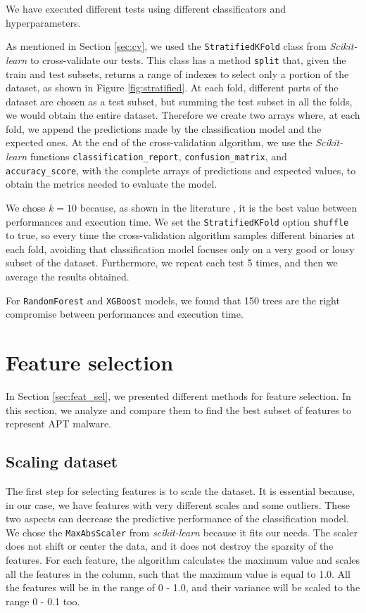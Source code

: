 We have executed different tests using different classificators and hyperparameters. 

As mentioned in Section \ref{sec:cv}, we used the \texttt{StratifiedKFold} class from \textit{Scikit-learn} to cross-validate our tests. This class has a method \texttt{split} that, given the train and test subsets, returns a range of indexes to select only a portion of the dataset, as shown in Figure \ref{fig:stratified}.  At each fold, different parts of the dataset are chosen as a test subset, but summing the test subset in all the folds, we would obtain the entire dataset. Therefore we create two arrays where, at each fold, we append the predictions made by the classification model and the expected ones. At the end of the cross-validation algorithm, we use the \textit{Scikit-learn} functions \texttt{classification\_report}, \texttt{confusion\_matrix}, and \texttt{accuracy\_score}, with the complete arrays of predictions and expected values, to obtain the metrics needed to evaluate the model.

We chose $k = 10$ because, as shown in the literature \cite{kohavi1995study}, it is the best value between performances and execution time. 
We set the \texttt{StratifiedKFold} option \texttt{shuffle} to true, so every time the cross-validation algorithm samples different binaries at each fold, avoiding that classification model focuses only on a very good or lousy subset of the dataset. Furthermore, we repeat each test 5 times, and then we average the results obtained.

For \texttt{RandomForest} and \texttt{XGBoost} models, we found that 150 trees are the right compromise between performances and execution time.

\section{Feature selection}
In Section \ref{sec:feat_sel}, we presented different methods for feature selection. In this section, we analyze and compare them to find the best subset of features to represent APT malware.

\subsection{Scaling dataset}
The first step for selecting features is to scale the dataset. It is essential because, in our case, we have features with very different scales and some outliers. These two aspects can decrease the predictive performance of the classification model. We chose the \texttt{MaxAbsScaler} from \textit{scikit-learn} because it fits our needs. The scaler does not shift or center the data, and it does not destroy the sparsity of the features. For each feature, the algorithm calculates the maximum value and scales all the features in the column, such that the maximum value is equal to 1.0. All the features will be in the range of 0 - 1.0, and their variance will be scaled to the range 0 - 0.1 too.

